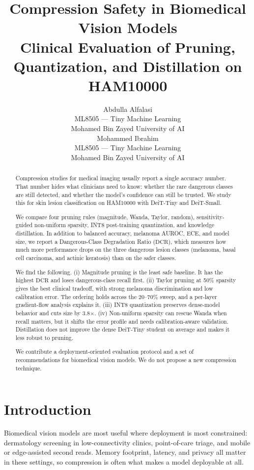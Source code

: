 \documentclass{article}
\title{Compression Safety in Biomedical Vision Models\\
Clinical Evaluation of Pruning, Quantization, and Distillation on HAM10000}
\author{%
  Abdulla Alfalasi \\
  ML8505 --- Tiny Machine Learning \\
  Mohamed Bin Zayed University of AI \\
  \And
  Mohammed Ibrahim \\
  ML8505 --- Tiny Machine Learning \\
  Mohamed Bin Zayed University of AI \\
}
\date{}
\newcommand{\DCR}{\ensuremath{\mathrm{DCR}}}
\begin{document}
\maketitle

\begin{abstract}
Compression studies for medical imaging usually report a single accuracy number. That number hides what clinicians need to know: whether the rare dangerous classes are still detected, and whether the model's confidence can still be trusted. We study this for skin lesion classification on HAM10000 with DeiT-Tiny and DeiT-Small.

We compare four pruning rules (magnitude, Wanda, Taylor, random), sensitivity-guided non-uniform sparsity, INT8 post-training quantization, and knowledge distillation. In addition to balanced accuracy, melanoma AUROC, ECE, and model size, we report a Dangerous-Class Degradation Ratio (\DCR{}), which measures how much more performance drops on the three dangerous lesion classes (melanoma, basal cell carcinoma, and actinic keratosis) than on the safer classes.

We find the following. (i) Magnitude pruning is the least safe baseline. It has the highest \DCR{} and loses dangerous-class recall first. (ii) Taylor pruning at 50\% sparsity gives the best clinical tradeoff, with strong melanoma discrimination and low calibration error. The ordering holds across the 20--70\% sweep, and a per-layer gradient-flow analysis explains it. (iii) INT8 quantization preserves dense-model behavior and cuts size by 3.8$\times$. (iv) Non-uniform sparsity can rescue Wanda when recall matters, but it shifts the error profile and needs calibration-aware validation. Distillation does not improve the dense DeiT-Tiny student on average and makes it less robust to pruning.

We contribute a deployment-oriented evaluation protocol and a set of recommendations for biomedical vision models. We do not propose a new compression technique.
\end{abstract}

\section{Introduction}
Biomedical vision models are most useful where deployment is most constrained: dermatology screening in low-connectivity clinics, point-of-care triage, and mobile or edge-assisted second reads. Memory footprint, latency, and privacy all matter in these settings, so compression is often what makes a model deployable at all.
\end{document}
